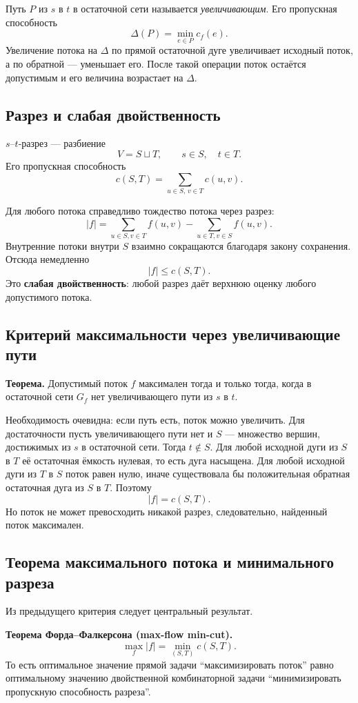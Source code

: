Путь $P$ из $s$ в $t$ в остаточной сети называется \emph{увеличивающим}. Его
пропускная способность
\[
    \Delta(P)=\min_{e\in P} c_f(e).
\]
Увеличение потока на $\Delta$ по прямой остаточной дуге увеличивает исходный
поток, а по обратной --- уменьшает его. После такой операции поток остаётся
допустимым и его величина возрастает на $\Delta$.

\subsection{Разрез и слабая двойственность}

$s$--$t$-разрез --- разбиение
\[
 V=S\sqcup T,
 \qquad s\in S,\quad t\in T.
\]
Его пропускная способность
\[
    c(S,T)=\sum_{u\in S,\,v\in T}c(u,v).
\]

Для любого потока справедливо тождество потока через разрез:
\[
 |f|=
 \sum_{u\in S,v\in T}f(u,v)
 -
 \sum_{u\in T,v\in S}f(u,v).
\]
Внутренние потоки внутри $S$ взаимно сокращаются благодаря закону сохранения.
Отсюда немедленно
\[
    |f|\le c(S,T).
\]
Это \textbf{слабая двойственность}: любой разрез даёт верхнюю оценку любого
допустимого потока.

\subsection{Критерий максимальности через увеличивающие пути}

\textbf{Теорема.} Допустимый поток $f$ максимален тогда и только тогда, когда в
остаточной сети $G_f$ нет увеличивающего пути из $s$ в $t$.

Необходимость очевидна: если путь есть, поток можно увеличить. Для достаточности
пусть увеличивающего пути нет и $S$ --- множество вершин, достижимых из $s$ в
остаточной сети. Тогда $t\notin S$. Для любой исходной дуги из $S$ в $T$ её
остаточная ёмкость нулевая, то есть дуга насыщена. Для любой исходной дуги из
$T$ в $S$ поток равен нулю, иначе существовала бы положительная обратная
остаточная дуга из $S$ в $T$. Поэтому
\[
    |f|=c(S,T).
\]
Но поток не может превосходить никакой разрез, следовательно, найденный поток
максимален.

\subsection{Теорема максимального потока и минимального разреза}

Из предыдущего критерия следует центральный результат.

\textbf{Теорема Форда--Фалкерсона (max-flow min-cut).}
\[
    \boxed{
    \max_f |f|=
    \min_{(S,T)} c(S,T)
    }.
\]
То есть оптимальное значение прямой задачи ``максимизировать поток'' равно
оптимальному значению двойственной комбинаторной задачи ``минимизировать
пропускную способность разреза''.

